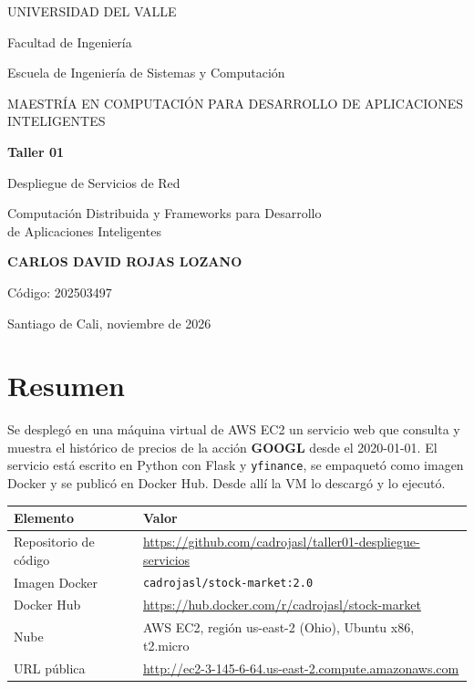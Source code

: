 \documentclass[11pt,a4paper]{article}
\begin{document}
\begin{titlepage}
  \centering
  {\large UNIVERSIDAD DEL VALLE\par}
  \vspace{0.2cm}
  {\normalsize Facultad de Ingeniería\par Escuela de Ingeniería de Sistemas y Computación\par}
  \vspace{0.4cm}
  {\normalsize MAESTRÍA EN COMPUTACIÓN PARA DESARROLLO DE APLICACIONES INTELIGENTES\par}
  \vspace{3cm}
  {\Huge\bfseries Taller 01\par}
  \vspace{0.4cm}
  {\LARGE Despliegue de Servicios de Red\par}
  \vspace{0.6cm}
  {\large Computación Distribuida y Frameworks para Desarrollo\\ de Aplicaciones Inteligentes\par}
  \vfill
  {\Large\bfseries CARLOS DAVID ROJAS LOZANO\par}
  \vspace{0.2cm}
  {\large Código: 202503497\par}
  \vspace{2cm}
  {\large Santiago de Cali, noviembre de 2026\par}
\end{titlepage}

\section{Resumen}
Se desplegó en una máquina virtual de AWS EC2 un servicio web que consulta y muestra el histórico de precios de la acción \textbf{GOOGL} desde el 2020-01-01. El servicio está escrito en Python con Flask y \texttt{yfinance}, se empaquetó como imagen Docker y se publicó en Docker Hub. Desde allí la VM lo descargó y lo ejecutó.

\begin{center}
\begin{tabular}{@{}ll@{}}
\toprule
\textbf{Elemento} & \textbf{Valor} \\
\midrule
Repositorio de código & \url{https://github.com/cadrojasl/taller01-despliegue-servicios} \\
Imagen Docker & \texttt{cadrojasl/stock-market:2.0} \\
Docker Hub & \url{https://hub.docker.com/r/cadrojasl/stock-market} \\
Nube & AWS EC2, región us-east-2 (Ohio), Ubuntu x86, t2.micro \\
URL pública & \url{http://ec2-3-145-6-64.us-east-2.compute.amazonaws.com} \\
\bottomrule
\end{tabular}
\end{center}
\end{document}
